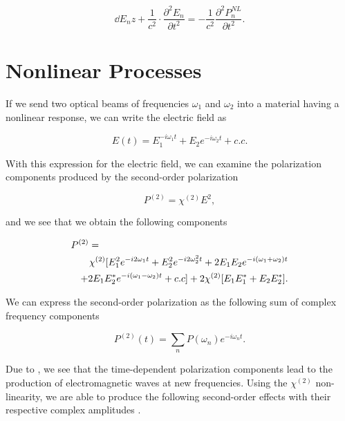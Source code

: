 \begin{equation}
  \label{eq:optical_wave_equation}
    \dd{E_n}{z} + \frac{1}{c^2} \cdot
\frac{\partial^2E_n}{\partial t^2}  =  - \frac{1}{c^2} \frac{\partial^2
P^{NL}_n}{\partial t^2}. 
\end{equation}

       
\section{Nonlinear Processes} 
\label{nonlinear_processes} 

If we send two optical beams of frequencies $\omega_1$ and $\omega_2$ into a
material having a nonlinear response, we can write the electric field as 

\begin{equation}
  \label{eq:two_component_field}
  E(t) = E_1 ^{-i \omega_1 t} + E_2 e^{-i \omega_2 t} + c.c.
\end{equation}

\noindent
With this expression for the electric field, we can examine the polarization components produced by the second-order polarization

\begin{equation}
  \label{eq:second_order_polar}
  P^{(2)}  = \chi^{(2)}E^2,
\end{equation}

\noindent
and we see that we obtain the following components
 
\begin{eqnarray}
  \label{eq:full_p2}
  \lefteqn{P^{(2)} = } \nonumber \\
  & & \chi^{(2)} [ E^2_1e^{-i 2 \omega_1 t} +  E^2_2e^{-i 2 \omega_2^2 t} + 2E_1E_2 e^{-i (\omega_1 +\omega_2) t} \nonumber  \\ 
  & &    +2E_1E^*_2  e^{-i (\omega_1 -\omega_2) t}+ c.c] + 2\chi^{(2)}[E_1E^*_1 + E_2E^*_2] .
\end{eqnarray}

\noindent
We can express the second-order polarization as the following sum of complex frequency components

\begin{equation}
  \label{eq:polzarization_components}
  P^{(2)}(t) = \sum_n{P(\omega_n) e^{-i \omega_n t}}. 
\end{equation}

\noindent
Due to , we see that the time-dependent polarization components lead to the production of electromagnetic waves at new frequencies.  Using the $\chi^{(2)}$ non-linearity, we are able to produce the following second-order effects with their respective complex amplitudes \cite{boyd}.

